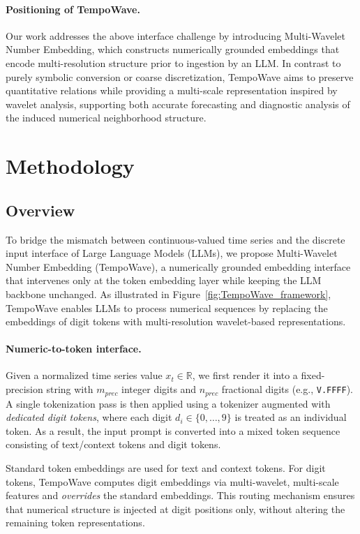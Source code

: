 \documentclass{article}
\begin{document}
\paragraph{Positioning of TempoWave.}
Our work addresses the above interface challenge by introducing Multi-Wavelet Number Embedding, which constructs numerically grounded embeddings that encode multi-resolution structure prior to ingestion by an LLM. In contrast to purely symbolic conversion or coarse discretization, TempoWave aims to preserve quantitative relations while providing a multi-scale representation inspired by wavelet analysis, supporting both accurate forecasting and diagnostic analysis of the induced numerical neighborhood structure.



\section{Methodology}
\label{sec:methodology}

\subsection{Overview}
To bridge the mismatch between continuous-valued time series and the discrete input interface of Large Language Models (LLMs), we propose {Multi-Wavelet Number Embedding (TempoWave)}, a numerically grounded embedding interface that intervenes only at the token embedding layer while keeping the LLM backbone unchanged.
As illustrated in Figure~\ref{fig:TempoWave_framework}, TempoWave enables LLMs to process numerical sequences by replacing the embeddings of digit tokens with multi-resolution wavelet-based representations.

\paragraph{Numeric-to-token interface.}
Given a normalized time series value $x_t \in \mathbb{R}$, we first render it into a fixed-precision string with $m_{prec}$ integer digits and $n_{prec}$ fractional digits (e.g., \texttt{V.FFFF}).
A single tokenization pass is then applied using a tokenizer augmented with \emph{dedicated digit tokens}, where each digit $d_i \in \{0,\ldots,9\}$ is treated as an individual token.
As a result, the input prompt is converted into a mixed token sequence consisting of text/context tokens and digit tokens.

Standard token embeddings are used for text and context tokens.
For digit tokens, TempoWave computes digit embeddings via multi-wavelet, multi-scale features and \emph{overrides} the standard embeddings.
This routing mechanism ensures that numerical structure is injected at digit positions only, without altering the remaining token representations.
\end{document}
